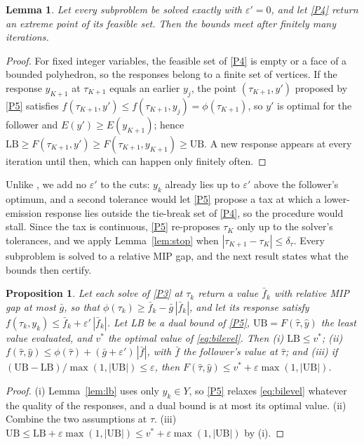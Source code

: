\documentclass[review,11pt,nonatbib]{elsarticle}
\newtheorem{proposition}{Proposition}
\newtheorem{lemma}{Lemma}
\theoremstyle{remark}
\begin{document}
\begin{lemma}\label{lem:finite}
Let every subproblem be solved exactly with $\varepsilon' = 0$, and let \eqref{P4} return an extreme point of its feasible set. Then the bounds meet after finitely many iterations.
\end{lemma}
\begin{proof}
For fixed integer variables, the feasible set of \eqref{P4} is empty or a face of a bounded polyhedron, so the responses belong to a finite set of vertices. If the response $y_{K+1}$ at $\tau_{K+1}$ equals an earlier $y_j$, the point $(\tau_{K+1}, y')$ proposed by \eqref{P5} satisfies $f(\tau_{K+1}, y') \le f(\tau_{K+1}, y_j) = \phi(\tau_{K+1})$, so $y'$ is optimal for the follower and $E(y') \ge E(y_{K+1})$; hence $\mathrm{LB} \ge F(\tau_{K+1}, y') \ge F(\tau_{K+1}, y_{K+1}) \ge \mathrm{UB}$. A new response appears at every iteration until then, which can happen only finitely often.
\end{proof}

Unlike \textcite{soares2021deterministic}, we add no $\varepsilon'$ to the cuts: $y_k$ already lies up to $\varepsilon'$ above the follower's optimum, and a second tolerance would let \eqref{P5} propose a tax at which a lower-emission response lies outside the tie-break set of \eqref{P4}, so the procedure would stall. Since the tax is continuous, \eqref{P5} re-proposes $\tau_K$ only up to the solver's tolerances, and we apply Lemma~\ref{lem:stop} when $|\tau_{K+1} - \tau_K| \le \delta_\tau$. Every subproblem is solved to a relative MIP gap, and the next result states what the bounds then certify.

\begin{proposition}\label{prop:certificate}
Let each solve of \eqref{P3} at $\tau_k$ return a value $\bar f_k$ with relative MIP gap at most $\bar g$, so that $\phi(\tau_k) \ge \bar f_k - \bar g\,|\bar f_k|$, and let its response satisfy $f(\tau_k, y_k) \le \bar f_k + \varepsilon'\,|\bar f_k|$. Let LB be a dual bound of \eqref{P5}, $\mathrm{UB} = F(\hat\tau, \hat y)$ the least value evaluated, and $v^*$ the optimal value of \eqref{eq:bilevel}. Then (i) $\mathrm{LB} \le v^*$; (ii) $f(\hat\tau, \hat y) \le \phi(\hat\tau) + (\bar g + \varepsilon')\,|\bar f|$, with $\bar f$ the follower's value at $\hat\tau$; and (iii) if $(\mathrm{UB} - \mathrm{LB})/\max(1, |\mathrm{UB}|) \le \varepsilon$, then $F(\hat\tau, \hat y) \le v^* + \varepsilon \max(1, |\mathrm{UB}|)$.
\end{proposition}
\begin{proof}
(i) Lemma~\ref{lem:lb} uses only $y_k \in Y$, so \eqref{P5} relaxes \eqref{eq:bilevel} whatever the quality of the responses, and a dual bound is at most its optimal value. (ii) Combine the two assumptions at $\hat\tau$. (iii) $\mathrm{UB} \le \mathrm{LB} + \varepsilon \max(1, |\mathrm{UB}|) \le v^* + \varepsilon \max(1, |\mathrm{UB}|)$ by (i).
\end{proof}
\end{document}
